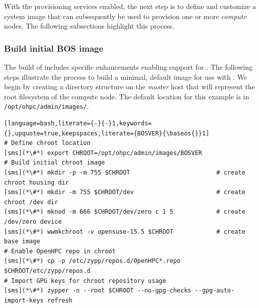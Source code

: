With the provisioning services enabled, the next step is to define and
customize a system image that can subsequently be used to provision one or more
{\em compute} nodes. The following subsections highlight this process.

\subsubsection{Build initial BOS image} \label{sec:assemble_bos}

The \OHPC{} build of \Warewulf{} includes specific enhancements enabling support for
\baseOS{}. The following steps illustrate the process to build a minimal, default
image for use with \Warewulf{}. We begin by creating a directory structure on the
{\em master} host that will represent the root filesystem of the compute node. The
default location for this example is in
\texttt{/opt/ohpc/admin/images/\baseos{}}.

\begin{lstlisting}[language=bash,literate={-}{-}1,keywords={},upquote=true,keepspaces,literate={BOSVER}{\baseos{}}1]
# Define chroot location
[sms](*\#*) export CHROOT=/opt/ohpc/admin/images/BOSVER
# Build initial chroot image
[sms](*\#*) mkdir -p -m 755 $CHROOT                        # create chroot housing dir
[sms](*\#*) mkdir -m 755 $CHROOT/dev                       # create chroot /dev dir
[sms](*\#*) mknod -m 666 $CHROOT/dev/zero c 1 5            # create /dev/zero device
[sms](*\#*) wwmkchroot -v opensuse-15.5 $CHROOT            # create base image
# Enable OpenHPC repo in chroot
[sms](*\#*) cp -p /etc/zypp/repos.d/OpenHPC*.repo $CHROOT/etc/zypp/repos.d
# Import GPG keys for chroot repository usage
[sms](*\#*) zypper -n --root $CHROOT --no-gpg-checks --gpg-auto-import-keys refresh
\end{lstlisting}
